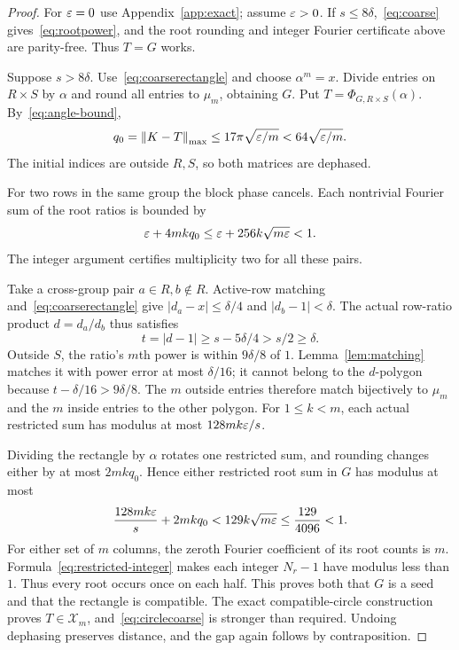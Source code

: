 \begin{proof}
For $\varepsilon=0$ use Appendix~\ref{app:exact}; assume $\varepsilon>0$. If $s\le8\delta$,~\eqref{eq:coarse} gives~\eqref{eq:rootpower}, and the root rounding and integer Fourier certificate above are parity-free. Thus $T=G$ works.

Suppose $s>8\delta$. Use~\eqref{eq:coarserectangle} and choose $\alpha^m=x$. Divide entries on $R\times S$ by $\alpha$ and round all entries to $\mu_m$, obtaining $G$. Put $T=\Phi_{G,R\times S}(\alpha)$. By~\eqref{eq:angle-bound},
\begin{equation}\label{eq:circlecoarse}
 q_0=\left\lVert K-T\right\rVert_{\mathrm{max}}\le17\pi\sqrt{\varepsilon/m}<64\sqrt{\varepsilon/m}.
\end{equation}
The initial indices are outside $R,S$, so both matrices are dephased.

For two rows in the same group the block phase cancels. Each nontrivial Fourier sum of the root ratios is bounded by
\[
 \varepsilon+4mkq_0\le\varepsilon+256k\sqrt{m\varepsilon}<1.
\]
The integer argument certifies multiplicity two for all these pairs.

Take a cross-group pair $a\in R,b\notin R$. Active-row matching and~\eqref{eq:coarserectangle} give $|d_a-x|\le\delta/4$ and $|d_b-1|<\delta$. The actual row-ratio product $d=d_a/d_b$ thus satisfies
\[
 t=|d-1|\ge s-5\delta/4>s/2\ge\delta.
\]
Outside $S$, the ratio's $m$th power is within $9\delta/8$ of $1$. Lemma~\ref{lem:matching} matches it with power error at most $\delta/16$; it cannot belong to the $d$-polygon because $t-\delta/16>9\delta/8$. The $m$ outside entries therefore match bijectively to $\mu_m$ and the $m$ inside entries to the other polygon. For $1\le k<m$, each actual restricted sum has modulus at most $128mk\varepsilon/s$.

Dividing the rectangle by $\alpha$ rotates one restricted sum, and rounding changes either by at most $2mkq_0$. Hence either restricted root sum in $G$ has modulus at most
\begin{equation}\label{eq:restricted-integer}
 \frac{128mk\varepsilon}{s}+2mkq_0
 <129k\sqrt{m\varepsilon}\le\frac{129}{4096}<1.
\end{equation}
For either set of $m$ columns, the zeroth Fourier coefficient of its root counts is $m$. Formula~\eqref{eq:restricted-integer} makes each integer $N_r-1$ have modulus less than $1$. Thus every root occurs once on each half. This proves both that $G$ is a seed and that the rectangle is compatible. The exact compatible-circle construction proves $T\in\mathcal X_m$, and~\eqref{eq:circlecoarse} is stronger than required. Undoing dephasing preserves distance, and the gap again follows by contraposition.
\end{proof}

